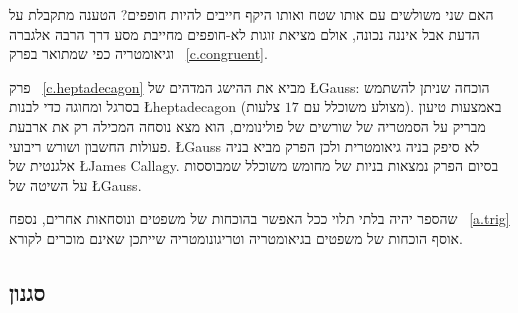 האם שני משולשים עם אותו שטח ואותו היקף חייבים להיות חופפים? הטענה מתקבלת על הדעת אבל איננה נכונה, אולם מציאת זוגות לא-חופפים מחייבת מסע דרך הרבה אלגברה וגיאומטריה כפי שמתואר בפרק~%
\ref{c.congruent}.


פרק~%
\ref{c.heptadecagon}
מביא את ההישג המדהים של 
\L{Gauss}:
הוכחה שניתן להשתמש בסרגל ומחוגה כדי לבנות 
\L{heptadecagon}
(מצולע משוכלל עם $17$ צלעות). באמצעות טיעון מבריק על הסמטריה של שורשים של פולינומים, הוא מצא נוסחה המכילה רק את ארבעת פעולות החשבון ושורש ריבועי. 
\L{Gauss}
לא סיפק בניה גיאומטרית ולכן הפרק מביא בניה אלגנטית של 
\L{James Callagy}.
בסיום הפרק נמצאות בניות של מחומש משוכלל שמבוססות על השיטה של
\L{Gauss}.



 שהספר יהיה בלתי תלוי ככל האפשר בהוכחות של משפטים ונוסחאות אחרים, נספח%
~\ref{a.trig}
אוסף הוכחות של משפטים בגיאומטריה וטריגונומטריה שייתכן שאינם מוכרים לקורא.


\subsection*{סגנון}

